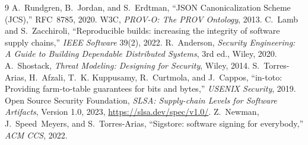 \begin{thebibliography}{9}
 A.~Rundgren, B.~Jordan, and S.~Erdtman, ``JSON Canonicalization Scheme (JCS),'' RFC~8785, 2020.
 W3C, \emph{PROV-O: The PROV Ontology}, 2013.
 C.~Lamb and S.~Zacchiroli, ``Reproducible builds: increasing the integrity of software supply chains,'' \emph{IEEE Software} 39(2), 2022.
 R.~Anderson, \emph{Security Engineering: A Guide to Building Dependable Distributed Systems}, 3rd ed., Wiley, 2020.
 A.~Shostack, \emph{Threat Modeling: Designing for Security}, Wiley, 2014.
 S.~Torres-Arias, H.~Afzali, T.~K. Kuppusamy, R.~Curtmola, and J.~Cappos, ``in-toto: Providing farm-to-table guarantees for bits and bytes,'' \emph{USENIX Security}, 2019.
 Open Source Security Foundation, \emph{SLSA: Supply-chain Levels for Software Artifacts}, Version 1.0, 2023, \url{https://slsa.dev/spec/v1.0/}.
 Z.~Newman, J.~Speed~Meyers, and S.~Torres-Arias, ``Sigstore: software signing for everybody,'' \emph{ACM CCS}, 2022.
\end{thebibliography}
